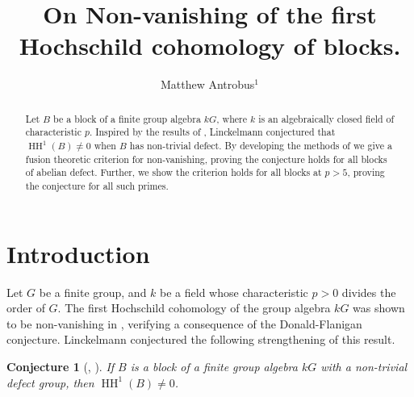 \documentclass{amsart}
\title{On Non-vanishing of the first Hochschild cohomology of blocks.}
\author{Matthew Antrobus$^1$}
\theoremstyle{plain}\newtheorem{theorem}{Theorem}[section]
\theoremstyle{plain}\newtheorem{conjecture}[theorem]{Conjecture}
\theoremstyle{plain}\newtheorem{corollary}[theorem]{Corollary}
\theoremstyle{plain}\newtheorem{lemma}[theorem]{Lemma}
\theoremstyle{plain}\newtheorem{proposition}[theorem]{Proposition}
\theoremstyle{plain}\newtheorem{statement}[theorem]{}
\theoremstyle{definition}\newtheorem{definition}[theorem]{Definition}
\theoremstyle{definition}\newtheorem{example}[theorem]{Example}
\theoremstyle{definition}\newtheorem{examples}[theorem]{Examples}
\theoremstyle{definition}\newtheorem{notation}[theorem]{Notation}
\theoremstyle{definition}\newtheorem{remark}[theorem]{Remark}
\theoremstyle{definition}\newtheorem{remarks}[theorem]{Remarks}
\theoremstyle{definition}\newtheorem{question}[theorem]{Question}
\theoremstyle{definition}\newtheorem{propositiondefinition}[theorem]{Definition/Proposition}
\DeclareMathOperator{\HH}{HH}
\begin{document}
\begin{abstract}
	Let $B$ be a block of a finite group algebra $kG$, where $k$ is an algebraically closed field of characteristic $p$. Inspired by the results of \cite{FJL}, Linckelmann conjectured that $\HH^1(B)\not=0$ when $B$ has non-trivial defect. By developing the methods of \cite{BR} we give a fusion theoretic criterion for non-vanishing, proving the conjecture holds for all blocks of abelian defect. Further, we show the criterion holds for all blocks at $p>5$, proving the conjecture for all such primes.
\end{abstract}


\maketitle

\section{Introduction}



Let $G$ be a finite group, and $k$ be a field whose characteristic $p>0$ divides the order of $G$. The first Hochschild cohomology of the group algebra $kG$ was shown to be non-vanishing in \cite{FJL}, verifying a consequence of the Donald-Flanigan conjecture. Linckelmann conjectured the following strengthening of this result.

\begin{conjecture}[\cite{LinckelmannTalk}, \cite{Linckelmann2}]\label{markus1}
If $B$ is a block of a finite group algebra $kG$ with a non-trivial defect group, then $\HH^1(B)\not=0$.
\end{conjecture}
\end{document}
